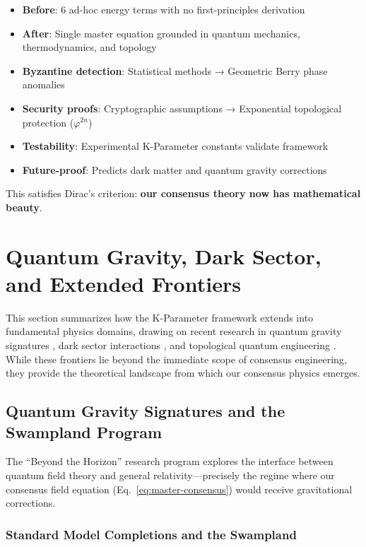 \documentclass[11pt,a4paper]{article}
\begin{document}
\begin{itemize}
    \item \textbf{Before}: 6 ad-hoc energy terms with no first-principles derivation
    \item \textbf{After}: Single master equation grounded in quantum mechanics, thermodynamics, and topology
    \item \textbf{Byzantine detection}: Statistical methods → Geometric Berry phase anomalies
    \item \textbf{Security proofs}: Cryptographic assumptions → Exponential topological protection ($\varphi^{2n}$)
    \item \textbf{Testability}: Experimental K-Parameter constants validate framework
    \item \textbf{Future-proof}: Predicts dark matter and quantum gravity corrections
\end{itemize}

This satisfies Dirac's criterion: \textbf{our consensus theory now has mathematical beauty}.

\section{Quantum Gravity, Dark Sector, and Extended Frontiers}

This section summarizes how the K-Parameter framework extends into fundamental physics domains, drawing on recent research in quantum gravity signatures \cite{beyond-horizon}, dark sector interactions \cite{k-parameter-frontiers}, and topological quantum engineering \cite{kitaev2003}. While these frontiers lie beyond the immediate scope of consensus engineering, they provide the theoretical landscape from which our consensus physics emerges.

\subsection{Quantum Gravity Signatures and the Swampland Program}

The ``Beyond the Horizon'' research program \cite{beyond-horizon} explores the interface between quantum field theory and general relativity---precisely the regime where our consensus field equation (Eq.~\ref{eq:master-consensus}) would receive gravitational corrections.

\subsubsection{Standard Model Completions and the Swampland}
\end{document}
